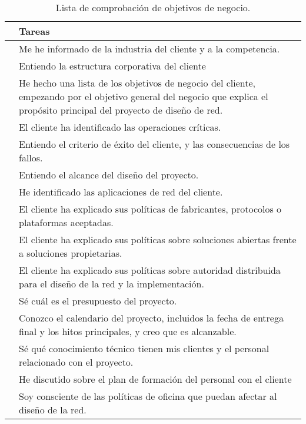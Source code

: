 \begin{table}[H]
	\begin{center}
		\begin{tabular}{|c|l|}
			\hline 
			 & Tareas  \\ 
			\hline \hline
			 & Me he informado de la industria del cliente y a la competencia.  \\ \hline
			 & Entiendo la estructura corporativa del cliente  \\ \hline
			 & He hecho una lista de los objetivos de negocio del cliente, empezando por el objetivo general del negocio que explica el propósito principal del proyecto de diseño de red.  \\ \hline
			 & El cliente ha identificado las operaciones críticas. \\ \hline
			 & Entiendo el criterio de éxito del cliente, y las consecuencias de los
			 fallos.  \\ \hline
			 & Entiendo el alcance del diseño del proyecto.  \\ \hline
			 & He identificado las aplicaciones de red del cliente.  \\ \hline
			 & El cliente ha explicado sus políticas de fabricantes, protocolos o
			 plataformas aceptadas.  \\ \hline
			 & El cliente ha explicado sus políticas sobre soluciones abiertas frente a
			 soluciones propietarias.  \\ \hline
			 & El cliente ha explicado sus políticas sobre autoridad distribuida para el
			 diseño de la red y la implementación.  \\ \hline
			 & Sé cuál es el presupuesto del proyecto.  \\ \hline
			 & Conozco el calendario del proyecto, incluidos la fecha de entrega final
			 y los hitos principales, y creo que es alcanzable.  \\ \hline
			 & Sé qué conocimiento técnico tienen mis clientes y el personal
			 relacionado con el proyecto.  \\ \hline
			 & He discutido sobre el plan de formación del personal con el cliente  \\ \hline
			 & Soy consciente de las políticas de oficina que puedan afectar al diseño
			 de la red.  \\ \hline
		\end{tabular}
		\caption{Lista de comprobación de objetivos de negocio.}
		\label{tabla:tabla1}
	\end{center}
\end{table}


